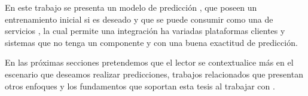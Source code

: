 En este trabajo se presenta un modelo de predicción \online, que poseen un entrenamiento inicial \offline si es deseado y que se puede consumir como una \API de servicios \REST, la cual permite una integración ha variadas plataformas clientes y sistemas que no tenga un componente \online y con una buena exactitud de predicción. 

En las próximas secciones pretendemos que el lector se contextualice más en el escenario que deseamos realizar predicciones, trabajos relacionados que presentan otros enfoques y los fundamentos que soportan esta tesis al trabajar con \webasccesslog.



